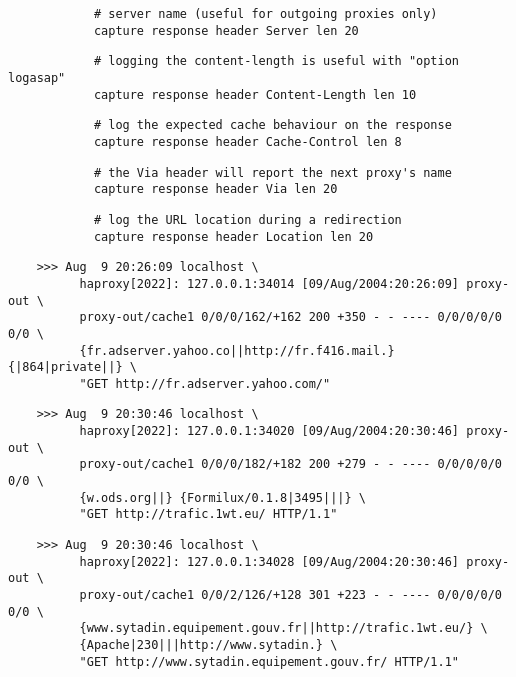 \begin{verbatim}
            # server name (useful for outgoing proxies only)
            capture response header Server len 20
\end{verbatim}

\begin{verbatim}
            # logging the content-length is useful with "option logasap"
            capture response header Content-Length len 10
\end{verbatim}

\begin{verbatim}
            # log the expected cache behaviour on the response
            capture response header Cache-Control len 8
\end{verbatim}

\begin{verbatim}
            # the Via header will report the next proxy's name
            capture response header Via len 20
\end{verbatim}

\begin{verbatim}
            # log the URL location during a redirection
            capture response header Location len 20
\end{verbatim}

\begin{verbatim}
    >>> Aug  9 20:26:09 localhost \
          haproxy[2022]: 127.0.0.1:34014 [09/Aug/2004:20:26:09] proxy-out \
          proxy-out/cache1 0/0/0/162/+162 200 +350 - - ---- 0/0/0/0/0 0/0 \
          {fr.adserver.yahoo.co||http://fr.f416.mail.} {|864|private||} \
          "GET http://fr.adserver.yahoo.com/"
\end{verbatim}

\begin{verbatim}
    >>> Aug  9 20:30:46 localhost \
          haproxy[2022]: 127.0.0.1:34020 [09/Aug/2004:20:30:46] proxy-out \
          proxy-out/cache1 0/0/0/182/+182 200 +279 - - ---- 0/0/0/0/0 0/0 \
          {w.ods.org||} {Formilux/0.1.8|3495|||} \
          "GET http://trafic.1wt.eu/ HTTP/1.1"
\end{verbatim}

\begin{verbatim}
    >>> Aug  9 20:30:46 localhost \
          haproxy[2022]: 127.0.0.1:34028 [09/Aug/2004:20:30:46] proxy-out \
          proxy-out/cache1 0/0/2/126/+128 301 +223 - - ---- 0/0/0/0/0 0/0 \
          {www.sytadin.equipement.gouv.fr||http://trafic.1wt.eu/} \
          {Apache|230|||http://www.sytadin.} \
          "GET http://www.sytadin.equipement.gouv.fr/ HTTP/1.1"
\end{verbatim}

